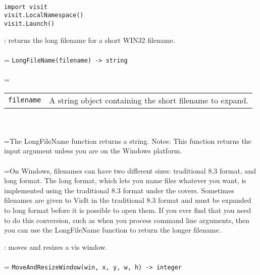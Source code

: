 \documentclass[10pt,a4paper]{report}
\begin{document}
\\[-6mm]
\begin{verbatim}import visit
visit.LocalNamespace()
visit.Launch()
\end{verbatim}
\newpage


{}
: returns the long filename for a short WIN32 filename.\\[-3mm]

 \\ 
\hangindent=\parindent 
\verb!LongFileName(filename) -> string!\\ [-3mm]

 \\ 
\hangindent=\parindent 
\begin{tabular}{lp{9cm}}
\verb!filename! & A string object containing the short filename to expand. \\
\end{tabular} \\[-2mm]


 \\ 
\hangindent=\parindent The LongFileName function returns a string. Notes: This function returns the input argument unless you are on the Windows platform. \\[-3mm] 

 \\ 
\hangindent=\parindent On Windows, filenames can have two different sizes: traditional 8.3 format, and long format. The long format, which lets you name files whatever you want, is implemented using the traditional 8.3 format under the covers. Sometimes filenames are given to VisIt in the traditional 8.3 format and must be expanded to long format before it is possible to open them. If you ever find that you need to do this conversion, such as when you process command line arguments, then you can use the LongFileName function to return the longer filename. \\[-3mm] 

\newpage


{}
: moves and resizes a vis window.\\[-3mm]

 \\ 
\hangindent=\parindent 
\verb!MoveAndResizeWindow(win, x, y, w, h) -> integer!\\ [-3mm]
\end{document}
